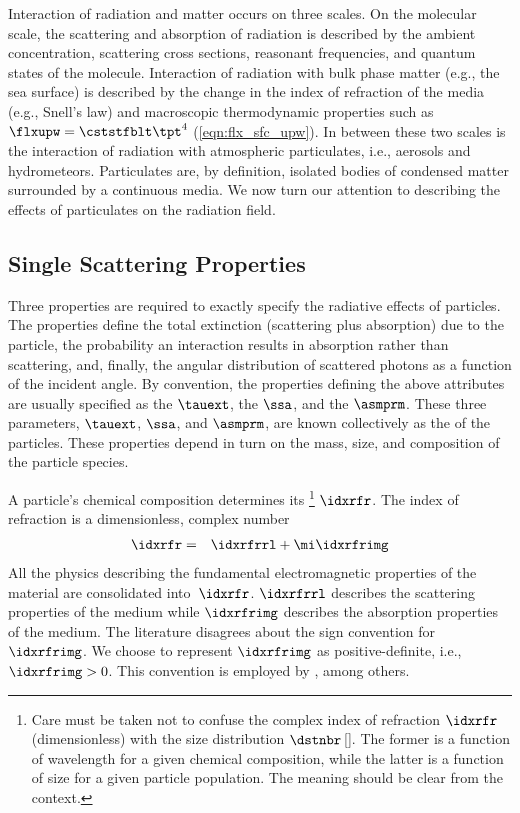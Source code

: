 \documentclass[12pt]{article}
\begin{document}
Interaction of radiation and matter occurs on three scales.
On the molecular scale, the scattering and absorption of radiation is
described by the ambient concentration, scattering cross sections,
reasonant frequencies, and quantum states of the molecule.
Interaction of radiation with bulk phase matter (e.g., the sea
surface) is described by the change in the index of refraction of the
media (e.g., Snell's law) and macroscopic thermodynamic properties
such as $\flxupw = \cststfblt \tpt^{4}$ (\ref{eqn:flx_sfc_upw}).
In between these two scales is the interaction of radiation with
atmospheric particulates, i.e., aerosols and hydrometeors.
Particulates are, by definition, isolated bodies of condensed matter
surrounded by a continuous media.
We now turn our attention to describing the effects of particulates on
the radiation field.

\subsection{Single Scattering Properties}\label{sxn:ssp}
Three properties are required to exactly specify the radiative effects 
of particles.
The properties define the total extinction (scattering plus
absorption) due to the particle, the probability an interaction
results in absorption rather than scattering, and, finally, the
angular distribution of scattered photons as a function of the
incident angle. 
By convention, the properties defining the above attributes are
usually specified as the  $\tauext$,
the  $\ssa$, and the
 $\asmprm$. 
These three parameters, $\tauext$, $\ssa$, and $\asmprm$, are known
collectively as the  of the
particles. 
These properties depend in turn on the mass, size, and composition of
the particle species.

A particle's chemical composition determines its \footnote{Care must be taken not to confuse the complex
index of refraction $\idxrfr$\,(dimensionless) with the size
distribution $\dstnbr$\,[\nbrxmCm]. 
The former is a function of wavelength for a given chemical
composition, while the latter is a function of size for a given
particle population. 
The meaning should be clear from the context.}
$\idxrfr$.
The index of refraction is a dimensionless, complex number 
\begin{eqnarray}
\idxrfr & = & \idxrfrrl + \mi \idxrfrimg
\label{eqn:idx_rfr_dfn}
\end{eqnarray}
All the physics describing the fundamental electromagnetic properties
of the material are consolidated into~$\idxrfr$.
$\idxrfrrl$ describes the scattering properties of the medium while 
$\idxrfrimg$ describes the absorption properties of the medium.
The literature disagrees about the sign convention for~$\idxrfrimg$.
We choose to represent $\idxrfrimg$ as positive-definite, i.e.,
$\idxrfrimg > 0$. 
This convention is employed by \cite{BoH83}, among others.
\end{document}
